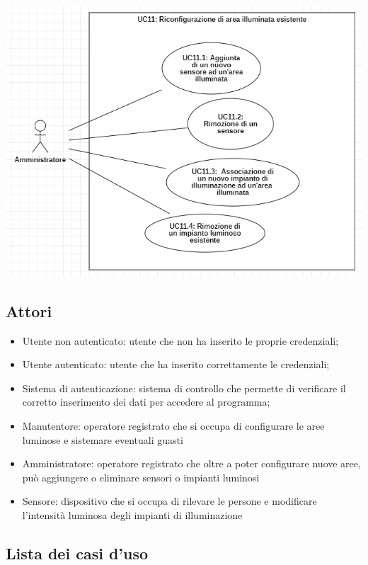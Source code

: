 \documentclass[a4paper, 12pt]{article}
\begin{document}
\includegraphics[scale=0.7]{diagramma_use_case_4.png}

\subsection{Attori}
\begin{itemize}
    \item Utente non autenticato: utente che non ha inserito le proprie credenziali;
    \item Utente autenticato: utente che ha inserito correttamente le credenziali;
    \item Sistema di autenticazione: sistema di controllo che permette di verificare il corretto inserimento dei dati per accedere al programma;
    \item Manutentore: operatore registrato che si occupa di configurare le aree luminose e sistemare eventuali guasti
    \item Amministratore: operatore registrato che oltre a poter configurare nuove aree, può aggiungere o eliminare sensori o impianti luminosi
    \item Sensore: dispositivo che si occupa di rilevare le persone e modificare l'intensità luminosa degli impianti di illuminazione
\end{itemize}

\subsection{Lista dei casi d'uso}
\end{document}
